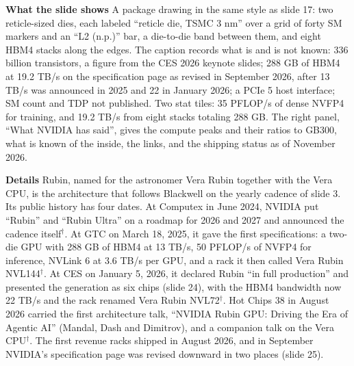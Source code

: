 \documentclass[11pt,letterpaper]{article}
\newcommand{\para}[1]{\medskip\noindent\textbf{#1}\quad}
\begin{document}
\para{What the slide shows} A package drawing in the same style as slide 17: two reticle-sized dies, each labeled ``reticle die, TSMC 3 nm'' over a grid of forty SM markers and an ``L2 (n.p.)'' bar, a die-to-die band between them, and eight HBM4 stacks along the edges. The caption records what is and is not known: 336 billion transistors, a figure from the CES 2026 keynote slides; 288 GB of HBM4 at 19.2 TB/s on the specification page as revised in September 2026, after 13 TB/s was announced in 2025 and 22 in January 2026; a PCIe 5 host interface; SM count and TDP not published. Two stat tiles: 35 PFLOP/s of dense NVFP4 for training, and 19.2 TB/s from eight stacks totaling 288 GB. The right panel, ``What NVIDIA has said'', gives the compute peaks and their ratios to GB300, what is known of the inside, the links, and the shipping status as of November 2026.

\para{Details} Rubin, named for the astronomer Vera Rubin together with the Vera CPU, is the architecture that follows Blackwell on the yearly cadence of slide 3. Its public history has four dates. At Computex in June 2024, NVIDIA put ``Rubin'' and ``Rubin Ultra'' on a roadmap for 2026 and 2027 and announced the cadence itself$^\dagger$. At GTC on March 18, 2025, it gave the first specifications: a two-die GPU with 288 GB of HBM4 at 13 TB/s, 50 PFLOP/s of NVFP4 for inference, NVLink 6 at 3.6 TB/s per GPU, and a rack it then called Vera Rubin NVL144$^\dagger$. At CES on January 5, 2026, it declared Rubin ``in full production'' and presented the generation as six chips (slide 24), with the HBM4 bandwidth now 22 TB/s and the rack renamed Vera Rubin NVL72$^\dagger$. Hot Chips 38 in August 2026 carried the first architecture talk, ``NVIDIA Rubin GPU: Driving the Era of Agentic AI'' (Mandal, Dash and Dimitrov), and a companion talk on the Vera CPU$^\dagger$. The first revenue racks shipped in August 2026, and in September NVIDIA's specification page was revised downward in two places (slide 25).
\end{document}
